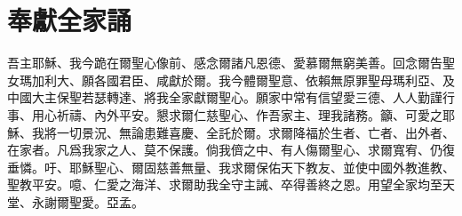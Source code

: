 \section*{奉獻全家誦}
吾主耶穌、我今跪在爾聖心像前、感念爾諸凡恩德、愛慕爾無窮美善。回念爾告聖女瑪加利大、願各國君臣、咸獻於爾。我今體爾聖意、依賴無原罪聖母瑪利亞、及中國大主保聖若瑟轉達、將我全家獻爾聖心。願家中常有信望愛三德、人人勤謹行事、用心祈禱、內外平安。懇求爾仁慈聖心、作吾家主、理我諸務。籲、可愛之耶穌、我將一切景況、無論患難喜慶、全託於爾。求爾降福於生者、亡者、出外者、在家者。凡爲我家之人、莫不保護。倘我儕之中、有人傷爾聖心、求爾寬宥、仍復垂憐。吁、耶穌聖心、爾固慈善無量、我求爾保佑天下教友、並使中國外教進教、聖教平安。噫、仁愛之海洋、求爾助我全守主誡、卒得善終之恩。用望全家均至天堂、永謝爾聖愛。{\cspace}亞孟。

